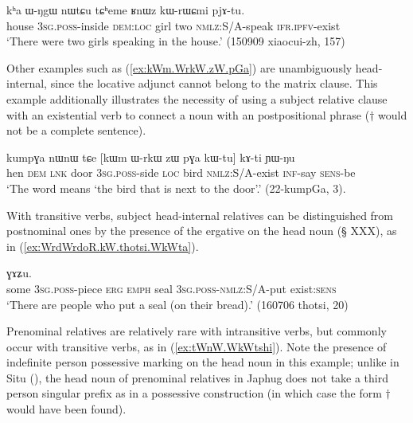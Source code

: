 \begin{exe}
\ex \label{ex:tCheme.RnWz.kWrWCmi}
 \gll  kʰa ɯ-ŋgɯ nɯtɕu tɕʰeme ʁnɯz kɯ-rɯɕmi pjɤ-tu. \\
 house \textsc{3sg}.\textsc{poss}-inside \textsc{dem}:\textsc{loc} girl two \textsc{nmlz}:S/A-speak \textsc{ifr}.\textsc{ipfv}-exist \\
\glt  `There were two girls speaking in the house.' (150909 xiaocui-zh, 157)
\end{exe}

Other examples such as (\ref{ex:kWm.WrkW.zW.pGa}) are unambiguously head-internal, since the locative adjunct  cannot belong to the matrix clause. This example additionally illustrates the necessity of using a subject relative clause with an existential verb to connect a noun with an postpositional phrase ($\dagger$ would not be a complete sentence).

\begin{exe}
\ex \label{ex:kWm.WrkW.zW.pGa}
 \gll  kumpɣa nɯnɯ tɕe [kɯm ɯ-rkɯ zɯ pɣa kɯ-tu] kɤ-ti ɲɯ-ŋu  \\
 hen \textsc{dem} \textsc{lnk} door \textsc{3sg}.\textsc{poss}-side \textsc{loc} bird \textsc{nmlz}:S/A-exist \textsc{inf}-say \textsc{sens}-be \\
 \glt `The word  means `the bird that is next to the door'.' (22-kumpGa, 3). 
\end{exe}

With transitive verbs, subject head-internal relatives can be distinguished from postnominal ones  by the presence of the ergative  on the head noun (§ XXX), as in (\ref{ex:WrdWrdoR.kW.thotsi.WkWta}).

\begin{exe}
\ex \label{ex:WrdWrdoR.kW.thotsi.WkWta}
  ɣɤʑu. \\
 some \textsc{3sg}.\textsc{poss}-piece \textsc{erg} \textsc{emph} seal \textsc{3sg}.\textsc{poss}-\textsc{nmlz}:S/A-put exist:\textsc{sens} \\
 \glt `There are people who put a seal (on their bread).' (160706 thotsi, 20)
\end{exe}

Prenominal relatives are relatively rare with intransitive verbs, but commonly occur with transitive verbs, as in (\ref{ex:tWnW.WkWtshi}). Note the presence of indefinite person possessive marking on the head noun  in this example; unlike in Situ (\citealt{jacksonlin07}), the head noun of prenominal relatives in Japhug does not take a third person singular prefix as in a possessive construction (in which case the form $\dagger$ would have been found).


